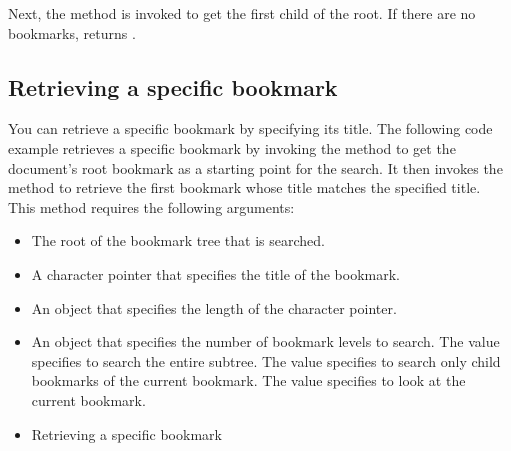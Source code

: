 \documentclass[letterpaper,12pt,english,openany,oneside]{sphinxmanual}
\begin{document}
Next, the  method is invoked to get the first child of the root. If there are no bookmarks,  returns .

\begin{sphinxVerbatim}[commandchars=\\\{\}]
  
    
    
    
   
\end{sphinxVerbatim}


\subsection{Retrieving a specific bookmark}
\label{\detokenize{Plugins_Bookmark:retrieving-a-specific-bookmark}}
You can retrieve a specific bookmark by specifying its title. The following code example retrieves a specific bookmark by invoking the  method to get the document’s root bookmark as a starting point for the search. It then invokes the  method to retrieve the first bookmark whose title matches the specified title. This method requires the following arguments:
\begin{itemize}
\item {} 
The root of the bookmark tree that is searched.

\item {} 
A character pointer that specifies the title of the bookmark.

\item {} 
An  object that specifies the length of the character pointer.

\item {} 
An  object that specifies the number of bookmark levels to search. The value  specifies to search the entire sub\sphinxhyphen{}tree. The value  specifies to search only child bookmarks of the current bookmark. The value  specifies to look at the current bookmark.

\item {} 
Retrieving a specific bookmark

\end{itemize}
\end{document}
